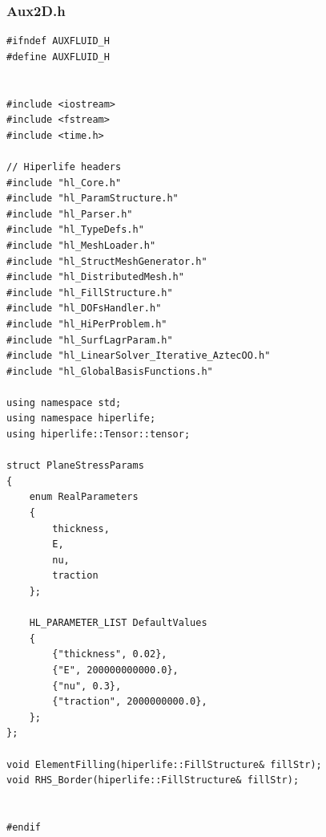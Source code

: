 \documentclass[]{article}
\begin{document}
\subsubsection{Aux2D.h} \label{sec: a.h}
\begin{lstlisting}
#ifndef AUXFLUID_H
#define AUXFLUID_H


#include <iostream>
#include <fstream>
#include <time.h>

// Hiperlife headers
#include "hl_Core.h"
#include "hl_ParamStructure.h"
#include "hl_Parser.h"
#include "hl_TypeDefs.h"
#include "hl_MeshLoader.h"
#include "hl_StructMeshGenerator.h"
#include "hl_DistributedMesh.h"
#include "hl_FillStructure.h"
#include "hl_DOFsHandler.h"
#include "hl_HiPerProblem.h"
#include "hl_SurfLagrParam.h"
#include "hl_LinearSolver_Iterative_AztecOO.h"
#include "hl_GlobalBasisFunctions.h"

using namespace std;
using namespace hiperlife;
using hiperlife::Tensor::tensor;

struct PlaneStressParams
{
	enum RealParameters
	{
		thickness,
		E,
		nu,
		traction
	};
	
	HL_PARAMETER_LIST DefaultValues
	{
		{"thickness", 0.02},
		{"E", 200000000000.0},
		{"nu", 0.3},
		{"traction", 2000000000.0},
	};
};

void ElementFilling(hiperlife::FillStructure& fillStr);
void RHS_Border(hiperlife::FillStructure& fillStr);


#endif

\end{lstlisting}
\end{document}
